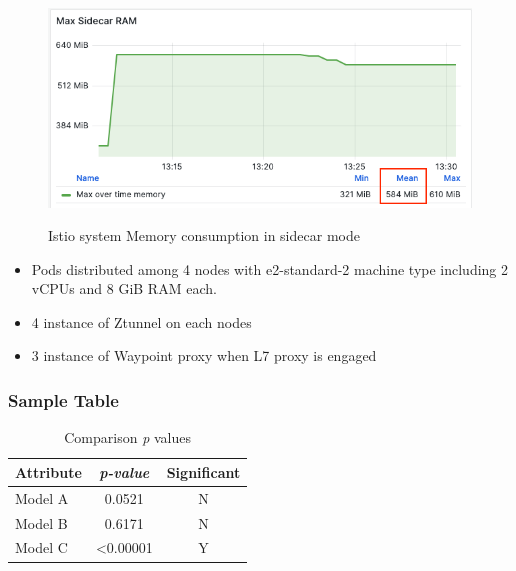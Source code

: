 \begin{figure}[ht!]
    \centering
    \caption{Istio system Memory consumption in sidecar mode}
    \includegraphics[width=0.9\linewidth]{resources/max-sidecar-ram.png}
    \label{result:maxSidecarRam}
\end{figure}



\begin{itemize}
    \item Pods distributed among 4 nodes with e2-standard-2 machine type including 2 vCPUs and 8 GiB RAM each.
    \item 4 instance of Ztunnel on each nodes
    \item 3 instance of Waypoint proxy when L7 proxy is engaged
\end{itemize}



\subsubsection{Sample Table}
\begin{table}[ht!]
\centering
    
	\caption{Comparison \textit{p} values}
	\begin{tabular}{ |l|c|c|}	
		\hline		
		\textbf{Attribute} & \textbf{\textit{p-value}} & \textbf{Significant} \\ \hline
		Model A	 & 0.0521 & N \\ \hline
		Model B  & 0.6171 & N \\ \hline 
		Model C  & <0.00001 & Y \\ \hline 
	\end{tabular}
	\label{tab:pvalues}
\end{table} 

